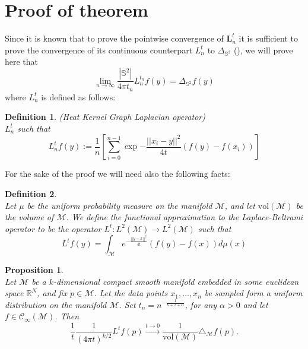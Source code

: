 \documentclass{article} %
\newtheorem{definition}{Definition}[section]
\newtheorem{prop}{Proposition}
\renewcommand{\b}[1]{{\bm{#1}}}   %
\begin{document}




\newpage
{\LARGE {}}
\appendix

\section{Proof of theorem}
Since it is known that to prove the pointwise convergence of $\b{L}_n^t$ it is sufficient to prove the convergence of its continuous counterpart $L_n^t$ to $\Delta_{\mathbb S^2}$ (\cite{belkin2005towards}), we will prove here that 
\begin{equation}\label{eq:continuous convergence}
 \lim_{n\to\infty} \frac{|\mathbb{S}^2|}{4\pi t_n} {L}_n^{t_n} f(y) =  \Delta_{\mathbb{S}^2}f(y)
\end{equation}
where $L_n^t$ is defined as follows:
\begin{definition}{}(Heat Kernel Graph Laplacian operator)\\
	\label{def:Heat Kernel Graph Laplacian operator}
	$L_n^t$ such that
	$$L_n^tf(y) := \frac{1}{n}\left[ \sum_{i=0}^{n-1} \exp{-\frac{||x_i-y||^2}{4t}}\left(f(y)-f(x_i)\right)\right]$$
\end{definition}
For the sake of the proof we will need also the following facts:
\begin{definition}{} \cite{belkin2005towards}\\ \label{eq: my L^t} Let $\mu$ be the uniform probability measure on the manifold $\mathcal M$, and let $\text{vol}(\mathcal M)$ be the volume of $\mathcal M$. We define the functional approximation to the Laplace-Beltrami operator to be the operator $L^t: L^{2}(\mathcal{M}) \rightarrow L^{2}(\mathcal{M})$ such that
	\label{def:Functional approximation to the Laplace-Beltrami operator}
	$$ L^tf(y) = \int_{\mathcal M}e^{-\frac{||y-x||^2}{4t}}\left(f(y)-f(x)\right)d\mu(x)$$
\end{definition}

\begin{prop} \cite{belkin2005towards} \\
Let $\mathcal M$ be a $k$-dimensional compact smooth manifold embedded in some euclidean space $\mathbb R^N$, and fix $p\in\mathcal M$. Let the data points $x_1, \dots, x_n$ be sampled form a uniform distribution on the manifold $\mathcal M$. Set $t_n=n^{-\frac{1}{k+2+\alpha}}$, for any $\alpha>0$ and let $f\in\mathcal C_\infty(\mathcal M)$. Then
	$$\frac{1}{t}\frac{1}{(4\pi t)^{k/2}} L^tf(p) \xrightarrow{t\to 0 } \frac{1}{\text{vol}(\mathcal M)}\triangle_{\mathcal M}f(p).$$
	\label{prop:3}
\end{prop}
\end{document}

